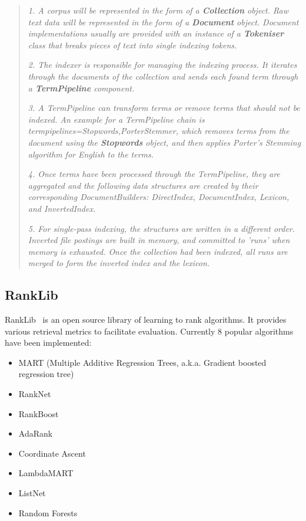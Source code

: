 \begin{quotation}
 \item \textit{1. A corpus will be represented in the form of a \textbf{Collection} object. Raw text data will be represented in the form of a \textbf{Document} object. 
 Document implementations usually are provided with an instance of a \textbf{Tokeniser} class that breaks pieces of text into single indexing tokens.}
 \item \textit{2. The indexer is responsible for managing the indexing process. It iterates through the documents of the collection and sends each found 
 term through a \textbf{TermPipeline} component.}
 \item \textit{3. A TermPipeline can transform terms or remove terms that should not be indexed. An example for a TermPipeline chain is 
 termpipelines=Stopwords,PorterStemmer, which removes terms from the document using the \textbf{Stopwords} object, and then applies Porter's Stemming algorithm 
 for English to the terms.}
 \item \textit{4. Once terms have been processed through the TermPipeline, they are aggregated and the following data structures are created by their corresponding 
 DocumentBuilders: DirectIndex, DocumentIndex, Lexicon, and InvertedIndex.}
 \item \textit{5. For single-pass indexing, the structures are written in a different order. Inverted file postings are built in memory, and committed to 'runs' 
 when memory is exhausted. Once the collection had been indexed, all runs are merged to form the inverted index and the lexicon.}
\end{quotation}

\subsection{RankLib}\label{section:rankLib}
RankLib~\cite{ranklib} is an open source library of learning to rank algorithms. It provides various retrieval metrics to facilitate evaluation.
Currently 8 popular algorithms have been implemented:
\begin{itemize}
 \item MART (Multiple Additive Regression Trees, a.k.a. Gradient boosted regression tree)
 \item RankNet
 \item RankBoost
 \item AdaRank
 \item Coordinate Ascent
 \item LambdaMART
 \item ListNet
 \item Random Forests
\end{itemize}

